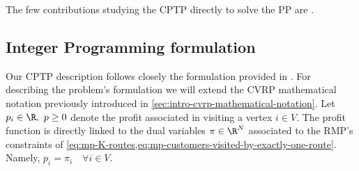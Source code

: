 The few contributions studying the CPTP directly to solve the PP
are \cite{jepsen2011, jepsen2014}.

\subsection{Integer Programming formulation}
\label{sec:cptp-integer-programming-formulation}

Our CPTP description follows closely the formulation provided in \textcite{jepsen2014}.
For describing the problem's formulation we will extend the CVRP mathematical notation
previously introduced in \cref{sec:intro-cvrp-mathematical-notation}.
Let $p_i \in \R,\ p \ge 0$ denote the profit associated in visiting a vertex $i \in V$.
The profit function is directly linked to the dual variables $\pi \in \R^N$ associated to
the RMP's constraints of \cref{eq:mp-K-routes,eq:mp-customers-visited-by-exactly-one-route}.
Namely, $p_i = \pi_i \quad \forall i \in V$.

